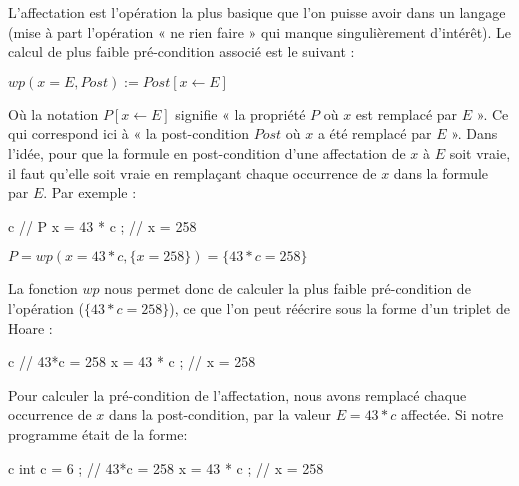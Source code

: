 \documentclass[middle]{zmdocument}
\begin{document}




L'affectation est l'opération la plus basique que l'on puisse avoir dans un 
langage (mise à part l'opération « ne rien faire » qui manque singulièrement 
d'intérêt). Le calcul de plus faible pré-condition associé est le suivant :




\begin{center}
$wp(x = E , Post) := Post[x \leftarrow E]$


\end{center}


Où la notation $P[x \leftarrow E]$ signifie « la propriété $P$ où $x$ est remplacé
par $E$ ». Ce qui correspond ici à « la post-condition $Post$ où $x$ a été
remplacé par $E$ ». Dans l'idée, pour que la formule en post-condition d'une 
affectation de $x$ à $E$ soit vraie, il faut qu'elle soit vraie en remplaçant 
chaque occurrence de $x$ dans la formule par $E$. Par exemple :



\begin{CodeBlock}{c}
// { P }
x = 43 * c ;
// { x = 258 }
\end{CodeBlock}




\begin{center}
$P = wp(x = 43*c , \{x = 258\}) = \{43*c = 258\}$


\end{center}


La fonction $wp$ nous permet donc de calculer la plus faible pré-condition de
l'opération ($\{43*c = 258\}$), ce que l'on peut réécrire sous la forme d'un
triplet de Hoare :



\begin{CodeBlock}{c}
// { 43*c = 258 }
x = 43 * c ;
// { x = 258 }
\end{CodeBlock}



Pour calculer la pré-condition de l'affectation, nous avons remplacé chaque 
occurrence de $x$ dans la post-condition, par la valeur $E = 43*c$ affectée.
Si notre programme était de la forme:



\begin{CodeBlock}{c}
int c = 6 ;
// { 43*c = 258 }
x = 43 * c ;
// { x = 258 }
\end{CodeBlock}
\end{document}
